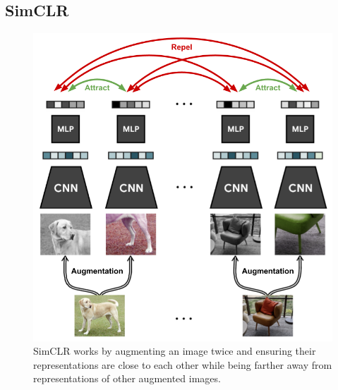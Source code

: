 \subsection{SimCLR} \label{ssec:simclr}
\begin{figure}[t]
    \centering
    \includegraphics[scale=0.4]{chapters/assets/ssl_figs/simclr_contrastive_learning.png}
    \caption{SimCLR works by augmenting an image twice and ensuring their representations are close to each other while being farther away from representations of other augmented images.}
    \label{fig:simclr}
\end{figure}

